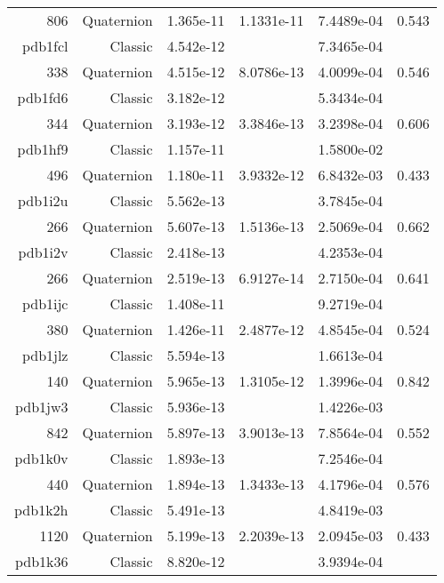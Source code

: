 \begin{xltabular}{\textwidth}{r|rS[table-format=1.3e+2]S[table-format=1.4e+2]S[table-format=1.4e+2]S[table-format=-1.3]}
806 & Quaternion & 1.365e-11 & 1.1331e-11 & 7.4489e-04 & 0.543\\  \addlinespace
{\color{red} pdb1fcl } & Classic & 4.542e-12 &  & 7.3465e-04 & \\
338 & Quaternion & 4.515e-12 & 8.0786e-13 & 4.0099e-04 & 0.546\\  \addlinespace
{\color{red} pdb1fd6 } & Classic & 3.182e-12 &  & 5.3434e-04 & \\
344 & Quaternion & 3.193e-12 & 3.3846e-13 & 3.2398e-04 & 0.606\\  \addlinespace
{\color{red} pdb1hf9 } & Classic & 1.157e-11 &  & 1.5800e-02 & \\
496 & Quaternion & 1.180e-11 & 3.9332e-12 & 6.8432e-03 & 0.433\\  \addlinespace
{\color{red} pdb1i2u } & Classic & 5.562e-13 &  & 3.7845e-04 & \\
266 & Quaternion & 5.607e-13 & 1.5136e-13 & 2.5069e-04 & 0.662\\  \addlinespace
{\color{red} pdb1i2v } & Classic & 2.418e-13 &  & 4.2353e-04 & \\
266 & Quaternion & 2.519e-13 & 6.9127e-14 & 2.7150e-04 & 0.641\\  \addlinespace
{\color{red} pdb1ijc } & Classic & 1.408e-11 &  & 9.2719e-04 & \\
380 & Quaternion & 1.426e-11 & 2.4877e-12 & 4.8545e-04 & 0.524\\  \addlinespace
{\color{red} pdb1jlz } & Classic & 5.594e-13 &  & 1.6613e-04 & \\
140 & Quaternion & 5.965e-13 & 1.3105e-12 & 1.3996e-04 & 0.842\\  \addlinespace
{\color{red} pdb1jw3 } & Classic & 5.936e-13 &  & 1.4226e-03 & \\
842 & Quaternion & 5.897e-13 & 3.9013e-13 & 7.8564e-04 & 0.552\\  \addlinespace
{\color{red} pdb1k0v } & Classic & 1.893e-13 &  & 7.2546e-04 & \\
440 & Quaternion & 1.894e-13 & 1.3433e-13 & 4.1796e-04 & 0.576\\  \addlinespace
{\color{red} pdb1k2h } & Classic & 5.491e-13 &  & 4.8419e-03 & \\
1120 & Quaternion & 5.199e-13 & 2.2039e-13 & 2.0945e-03 & 0.433\\  \addlinespace
{\color{red} pdb1k36 } & Classic & 8.820e-12 &  & 3.9394e-04 & \\

\end{xltabular}
